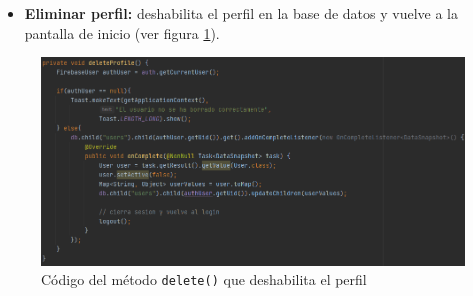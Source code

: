 \begin{itemize}    
    \begin{itemize}
        \item \textbf{Eliminar perfil:} deshabilita el perfil en la base de datos y vuelve a la pantalla de inicio (ver figura \ref{fig:delete}).
    \end{itemize}
\end{itemize}
\begin{figure}[H]
    \centering
    \includegraphics[width=\textwidth]{Images/Capitulo7/delete.png}
    \caption{Código del método \texttt{delete()} que deshabilita el perfil}
    \label{fig:delete}
\end{figure}






